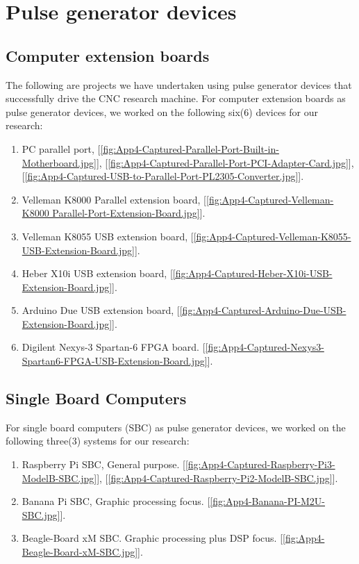 \section{Pulse generator devices}

\subsection{Computer extension boards}
The following are projects we have undertaken using pulse generator devices that successfully drive the CNC research machine. For computer extension boards as pulse generator devices, we worked on the following six(6) devices for our research: 
\begin{enumerate}
	\item PC parallel port, [\ref{fig:App4-Captured-Parallel-Port-Built-in-Motherboard.jpg}], [\ref{fig:App4-Captured-Parallel-Port-PCI-Adapter-Card.jpg}], [\ref{fig:App4-Captured-USB-to-Parallel-Port-PL2305-Converter.jpg}].
	
	\item Velleman K8000 Parallel extension board, [\ref{fig:App4-Captured-Velleman-K8000 Parallel-Port-Extension-Board.jpg}].
	
	\item Velleman K8055 USB extension board, [\ref{fig:App4-Captured-Velleman-K8055-USB-Extension-Board.jpg}].
	
	\item Heber X10i USB extension board, [\ref{fig:App4-Captured-Heber-X10i-USB-Extension-Board.jpg}].
	
	\item Arduino Due USB extension board, [\ref{fig:App4-Captured-Arduino-Due-USB-Extension-Board.jpg}].
	
	\item Digilent Nexys-3 Spartan-6 FPGA board. [\ref{fig:App4-Captured-Nexys3-Spartan6-FPGA-USB-Extension-Board.jpg}].
	
\end{enumerate}
 

\subsection{Single Board Computers}

For single board computers (SBC) as pulse generator devices, we worked on the following three(3) systems for our research: 
\begin{enumerate}
	\item Raspberry Pi SBC, General purpose. [\ref{fig:App4-Captured-Raspberry-Pi3-ModelB-SBC.jpg}], [\ref{fig:App4-Captured-Raspberry-Pi2-ModelB-SBC.jpg}].
	
	\item Banana Pi SBC, Graphic processing focus. [\ref{fig:App4-Banana-PI-M2U-SBC.jpg}].
	
	\item Beagle-Board xM SBC. Graphic processing plus DSP focus. [\ref{fig:App4-Beagle-Board-xM-SBC.jpg}].
	
\end{enumerate}

